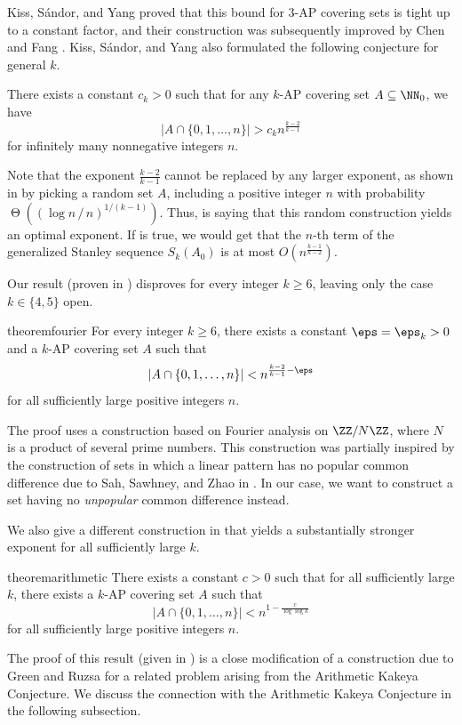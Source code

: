 \documentclass[11pt,reqno]{amsart}
\begin{document}
Kiss, S\'andor, and Yang proved that this bound for $3$-AP 
covering sets is tight up to a constant factor, 
and their construction was subsequently improved by 
Chen and Fang \cite{ap3_covering_1, ap3_covering_2}.
Kiss, S\'andor, and Yang also formulated the following conjecture 
for general $k$.
\begin{conjecture}
\label{conj:general_k}
There exists a constant $c_k>0$ such that 
for any $k$-AP covering set $A\subseteq\NN_0$, we have
$$|A\cap \{0,1,\dots,n\}| > c_k n^{\frac{k-2}{k-1}}$$
for infinitely many nonnegative integers $n$.
\end{conjecture}
Note that the exponent $\frac{k-2}{k-1}$ cannot be 
replaced by any larger exponent, as shown in 
\cite[Thm.~3]{generalized} by picking a random set $A$,
including a positive integer $n$ with probability 
$\operatorname{\Theta}\left((\log n\,/\,n)^{1/(k-1)}\right)$.
Thus,  is saying that 
this random construction yields an optimal exponent.
If  is true, we would get that 
the $n$-th term of the generalized Stanley sequence 
$S_k(A_0)$ is at most $O\left(n^{\frac{k-1}{k-2}}\right)$.


Our result (proven in )
disproves  for every integer $k\geq 6$, 
leaving only the case $k\in\{4,5\}$ open.

\begin{restatable}{theorem}{fourier}
\label{thm:fourier}
For every integer $k\geq 6$, 
there exists a constant $\eps=\eps_k>0$ 
and a $k$-AP covering set 
$A$ such that 
$$|A\cap \{0,1,\dots,n\}| <  n^{\frac{k-2}{k-1}-\eps}$$
for all sufficiently large positive integers $n$.
\end{restatable}
The proof uses a construction based on Fourier analysis 
on $\ZZ/N\ZZ$, where $N$ is a product of several prime numbers.
This construction was partially inspired by the construction of
sets in which a linear pattern has no popular common difference
due to Sah, Sawhney, and Zhao in \cite{popular}.
In our case, we want to construct a set having no 
\emph{unpopular} common difference instead.

We also give a different construction 
in  that yields a substantially 
stronger exponent for all sufficiently large $k$.

\begin{restatable}{theorem}{arithmetic}
\label{thm:arithmetic}
There exists a constant $c>0$ such that for all
sufficiently large $k$, there exists a $k$-AP covering set 
$A$ such that 
$$|A\cap \{0,1,\dots,n\}| <  n^{1-\frac{c}{\log\log k}}$$
for all sufficiently large positive integers $n$.
\end{restatable}
The proof of this result (given in ) 
is a close modification of a construction 
due to Green and Ruzsa \cite[Thm.~1.2]{arithmetic_kakeya}
for a related problem arising from the Arithmetic Kakeya 
Conjecture. 
We discuss the connection with the Arithmetic Kakeya 
Conjecture in the following subsection.
\end{document}
